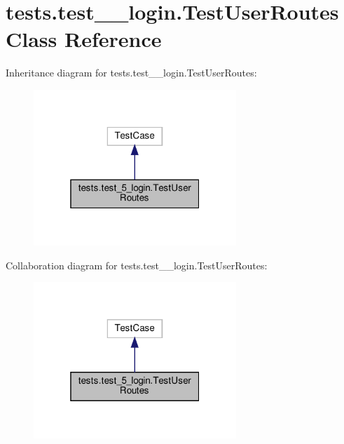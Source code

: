 \hypertarget{classtests_1_1test__5__login_1_1_test_user_routes}{}\section{tests.\+test\+\_\+\_\+login.\+Test\+User\+Routes Class Reference}
\label{classtests_1_1test__5__login_1_1_test_user_routes}


Inheritance diagram for tests.\+test\+\_\+\_\+login.\+Test\+User\+Routes\+:\nopagebreak
\begin{figure}[H]
\begin{center}
\leavevmode
\includegraphics[width=217pt]{classtests_1_1test__5__login_1_1_test_user_routes__inherit__graph}
\end{center}
\end{figure}


Collaboration diagram for tests.\+test\+\_\+\_\+login.\+Test\+User\+Routes\+:\nopagebreak
\begin{figure}[H]
\begin{center}
\leavevmode
\includegraphics[width=217pt]{classtests_1_1test__5__login_1_1_test_user_routes__coll__graph}
\end{center}
\end{figure}
